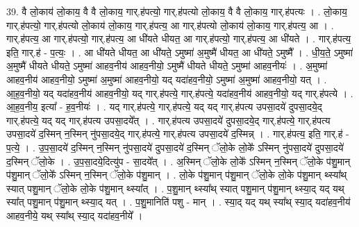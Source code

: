 \documentclass[17pt]{extarticle}
\begin{document}
39. वै लो॒काय॑ लो॒काय॒ वै वै लो॒काय॒ गार्.ह॑पत्यो॒ गार्.ह॑पत्यो लो॒काय॒ वै वै लो॒काय॒ गार्.ह॑पत्यः । . लो॒काय॒ गार्.ह॑पत्यो॒ गार्.ह॑पत्यो लो॒काय॑ लो॒काय॒ गार्.ह॑पत्य॒ आ गार्.ह॑पत्यो लो॒काय॑ लो॒काय॒ गार्.ह॑पत्य॒ आ । . गार्.ह॑पत्य॒ आ गार्.ह॑पत्यो॒ गार्.ह॑पत्य॒ आ धी॑यते धीयत॒ आ गार्.ह॑पत्यो॒ गार्.ह॑पत्य॒ आ धी॑यते । . गार्.ह॑पत्य॒ इति॒ गार्.ह॑ - प॒त्यः॒ । . आ धी॑यते धीयत॒ आ धी॑यते॒ ऽमुष्मा॑ अ॒मुष्मै॑ धीयत॒ आ धी॑यते॒ ऽमुष्मै᳚ । . धी॒य॒ते॒ ऽमुष्मा॑ अ॒मुष्मै॑ धीयते धीयते॒ ऽमुष्मा॑ आहव॒नीय॑ आहव॒नीयो॒ ऽमुष्मै॑ धीयते धीयते॒ ऽमुष्मा॑ आहव॒नीयः॑ । . अ॒मुष्मा॑ आहव॒नीय॑ आहव॒नीयो॒ ऽमुष्मा॑ अ॒मुष्मा॑ आहव॒नीयो॒ यद् यदा॑हव॒नीयो॒ ऽमुष्मा॑ अ॒मुष्मा॑ आहव॒नीयो॒ यत् । . आ॒ह॒व॒नीयो॒ यद् यदा॑हव॒नीय॑ आहव॒नीयो॒ यद् गार्.ह॑पत्ये॒ गार्.ह॑पत्ये॒ यदा॑हव॒नीय॑ आहव॒नीयो॒ यद् गार्.ह॑पत्ये । . आ॒ह॒व॒नीय॒ इत्या᳚ - ह॒व॒नीयः॑ । . यद् गार्.ह॑पत्ये॒ गार्.ह॑पत्ये॒ यद् यद् गार्.ह॑पत्य उपसा॒दये॑ दुपसा॒दये॒द् गार्.ह॑पत्ये॒ यद् यद् गार्.ह॑पत्य उपसा॒दये᳚त् । . गार्.ह॑पत्य उपसा॒दये॑ दुपसा॒दये॒द् गार्.ह॑पत्ये॒ गार्.ह॑पत्य उपसा॒दये॑ द॒स्मिन् न॒स्मिन् नु॑पसा॒दये॒द् गार्.ह॑पत्ये॒ गार्.ह॑पत्य उपसा॒दये॑ द॒स्मिन्न् । . गार्.ह॑पत्य॒ इति॒ गार्.ह॑ - प॒त्ये॒ । . उ॒प॒सा॒दये॑ द॒स्मिन् न॒स्मिन् नु॑पसा॒दये॑ दुपसा॒दये॑ द॒स्मिन् ॅलो॒के लो॒के᳚ ऽस्मिन् नु॑पसा॒दये॑ दुपसा॒दये॑ द॒स्मिन् ॅलो॒के । . उ॒प॒सा॒दये॒दित्यु॑प - सा॒दये᳚त् । . अ॒स्मिन् ॅलो॒के लो॒के᳚ ऽस्मिन् न॒स्मिन् ॅलो॒के प॑शु॒मान् प॑शु॒मान् ॅलो॒के᳚ ऽस्मिन् न॒स्मिन् ॅलो॒के प॑शु॒मान् । . लो॒के प॑शु॒मान् प॑शु॒मान् ॅलो॒के लो॒के प॑शु॒मान् थ्स्या᳚थ् स्यात् पशु॒मान् ॅलो॒के लो॒के प॑शु॒मान् थ्स्या᳚त् । . प॒शु॒मान् थ्स्या᳚थ् स्यात् पशु॒मान् प॑शु॒मान् थ्स्या॒द् यद् यथ् स्या᳚त् पशु॒मान् प॑शु॒मान् थ्स्या॒द् यत् । . प॒शु॒मानिति॑ पशु - मान् । . स्या॒द् यद् यथ् स्या᳚थ् स्या॒द् यदा॑हव॒नीय॑ आहव॒नीये॒ यथ् स्या᳚थ् स्या॒द् यदा॑हव॒नीये᳚ । \newline
\end{document}
